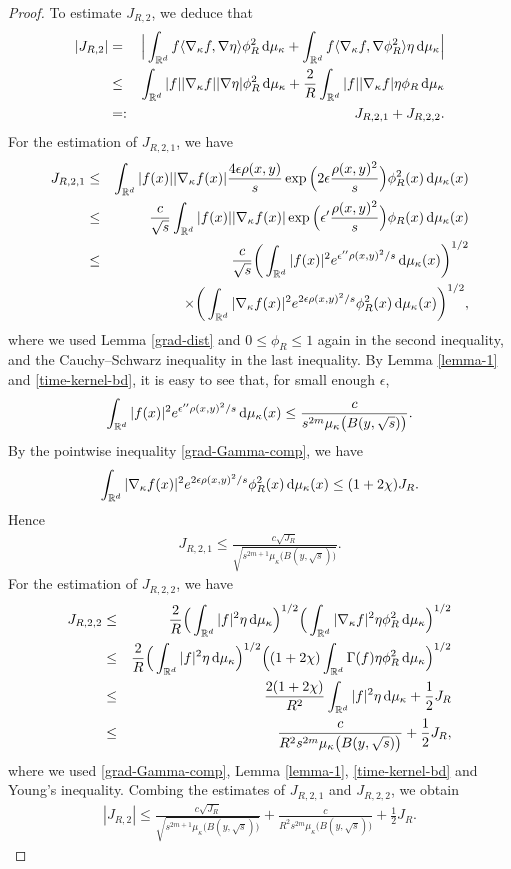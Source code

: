 \documentclass[11pt,a4paper]{article}
\def\R{\mathbb{R}}
\def\d{\textup{d}}
\theoremstyle{definition}\newtheorem{remark}[theorem]{Remark}
\begin{document}
\begin{proof}
To estimate $J_{R,2}$, we deduce that
\begin{eqnarray*}
|J_{R,2}|&=&\Big|\int_{\R^d}f\langle \nabla_\kappa f,\nabla \eta\rangle \phi_R^2\,\d\mu_\kappa + \int_{\R^d}f\langle \nabla_\kappa f,\nabla\phi_R^2\rangle \eta\,\d\mu_\kappa \Big|\\
&\leq&\int_{\R^d}|f||\nabla_\kappa f||\nabla\eta|\phi_R^2\,\d\mu_\kappa + \frac{2}{R}\int_{\R^d}|f||\nabla_\kappa f|\eta\phi_R\,\d\mu_\kappa\\
&=:& J_{R,2,1}+J_{R,2,2}.
\end{eqnarray*}
For the estimation of $ J_{R,2,1}$, we have
\begin{eqnarray*}
 J_{R,2,1}&\leq& \int_{\R^d}|f(x)||\nabla_\kappa f(x)|\frac{4\epsilon\rho(x,y)}{s}\exp\Big(2\epsilon\frac{\rho(x,y)^2}{s}\Big)\phi_R^2(x)\,\d\mu_\kappa(x)\\
&\leq&\frac{c}{\sqrt{s}}\int_{\R^d}|f(x)||\nabla_\kappa f(x)|\exp\Big(\epsilon'\frac{\rho(x,y)^2}{s}\Big)\phi_R(x)\,\d\mu_\kappa(x)\\
&\leq&\frac{c}{\sqrt{s}}\bigg(\int_{\R^d}|f(x)|^2e^{\epsilon''\rho(x,y)^2/s}\,\d\mu_\kappa(x)\bigg)^{1/2}\\
&&\times\bigg(\int_{\R^d}|\nabla_\kappa f(x)|^2e^{2\epsilon\rho(x,y)^2/s}\phi_R^2(x)\,\d\mu_\kappa(x)\bigg)^{1/2},
\end{eqnarray*}
where we used Lemma \ref{grad-dist} and $0\leq\phi_R\leq1$ again in the second inequality, and the Cauchy--Schwarz inequality in the last inequality. By Lemma \ref{lemma-1} and \eqref{time-kernel-bd}, it is easy to see that, for small enough $\epsilon$,
$$\int_{\R^d}|f(x)|^2e^{\epsilon''\rho(x,y)^2/s}\,\d\mu_\kappa(x)\leq\frac{c}{s^{2m}\mu_\kappa\big(B(y,\sqrt{s})\big)}.$$
By the pointwise inequality \eqref{grad-Gamma-comp}, we have
$$\int_{\R^d}|\nabla_\kappa f(x)|^2e^{2\epsilon\rho(x,y)^2/s}\phi_R^2(x)\,\d\mu_\kappa(x)\leq(1+2\chi)J_R.$$
Hence
\begin{eqnarray*}\label{lemma-2-2}
J_{R,2,1}\leq \frac{c \sqrt{J_R}}{\sqrt{s^{2m+1}\mu_\kappa\big(B(y,\sqrt{s})\big)}}.
\end{eqnarray*}
For the estimation of $J_{R,2,2}$, we have
\begin{eqnarray*}\label{}
J_{R,2,2}&\leq& \frac{2}{R}\Big(\int_{\R^d}|f|^2\eta\,\d\mu_\kappa\Big)^{1/2}\Big(\int_{\R^d}|\nabla_\kappa f|^2\eta\phi_R^2\,\d\mu_\kappa\Big)^{1/2}\cr
&\leq& \frac{2}{R}\Big(\int_{\R^d}|f|^2\eta\,\d\mu_\kappa\Big)^{1/2}\Big((1+2\chi)\int_{\R^d}\Gamma(f)\eta\phi_R^2\,\d\mu_\kappa\Big)^{1/2}\cr
&\leq& \frac{2(1+2\chi)}{R^2}\int_{\R^d}|f|^2\eta\,\d\mu_\kappa +\frac{1}{2}J_R\\
&\leq&\frac{c}{R^2 s^{2m}\mu_\kappa\big(B(y,\sqrt{s})\big)}+\frac{1}{2}J_R,
\end{eqnarray*}
where we used \eqref{grad-Gamma-comp}, Lemma \ref{lemma-1}, \eqref{time-kernel-bd} and Young's inequality. Combing the estimates of $J_{R,2,1}$ and $J_{R,2,2}$, we obtain
\begin{eqnarray}\label{lemma-2-2}
|J_{R,2}|\leq \frac{c \sqrt{J_R}}{\sqrt{s^{2m+1}\mu_\kappa\big(B(y,\sqrt{s})\big)}}+ \frac{c}{R^2 s^{2m}\mu_\kappa\big(B(y,\sqrt{s})\big)}+\frac{1}{2}J_R.
\end{eqnarray}


\end{proof}
\end{document}
